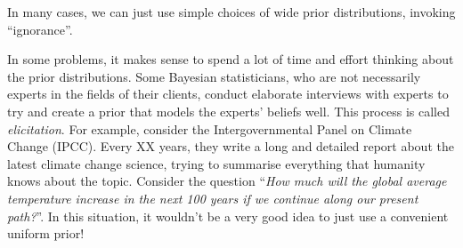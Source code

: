 In many cases, we can just use simple choices of wide prior distributions,
invoking ``ignorance''.

In some problems, it makes sense to spend a lot of time and effort thinking
about the prior distributions. Some Bayesian statisticians, who are not
necessarily experts in the fields of their clients, conduct elaborate interviews
with experts to try and create a prior that models the experts' beliefs well.
This process is called {\it elicitation}.
For example, consider the Intergovernmental Panel on Climate Change (IPCC).
Every XX years, they write a long and detailed report about the latest climate
change science, trying to summarise everything that humanity knows about the
topic. Consider the question ``{\it How much will the global average temperature
increase in the next 100 years if we continue along our present path?}''.
In this situation, it wouldn't be a very good idea to just use a convenient
uniform prior!








%

